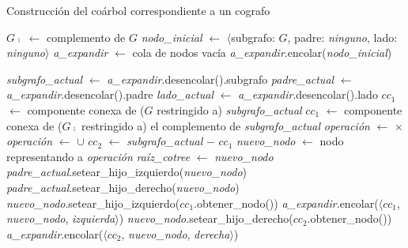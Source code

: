 \bigskip
\begin{algorithm}[H]
    \SetAlgoVlined
    \caption{Construcción del coárbol correspondiente a un cografo}

    $G\comp$ $\gets$ complemento de $G$ \;
    \textit{nodo\_inicial} $\gets$
    $\langle$subgrafo: $G$, padre: \textit{ninguno}, lado: \textit{ninguno}$\rangle$ \;
    \textit{a\_expandir} $\gets$ cola de nodos vacía \;
    \textit{a\_expandir}.encolar(\textit{nodo\_inicial}) \;

     {
        \textit{subgrafo\_actual} $\gets$ \textit{a\_expandir}.desencolar().subgrafo \;
        \textit{padre\_actual} $\gets$ \textit{a\_expandir}.desencolar().padre \;
        \textit{lado\_actual} $\gets$ \textit{a\_expandir}.desencolar().lado \;
        $cc_1$ $\gets$ componente conexa de ($G$ restringido a) \textit{subgrafo\_actual} \;
         {
            $cc_1$ $\gets$ componente conexa de ($G\comp$ restringido a) el complemento de \textit{subgrafo\_actual} \;
            \textit{operación} $\gets$ $\times$ \;
        } {
            \textit{operación} $\gets$ $\cup$ \;
        }
        $cc_2$ $\gets$ \textit{subgrafo\_actual} $-$ $cc_1$ \;
        \textit{nuevo\_nodo} $\gets$ nodo representando a \textit{operación} \;
         {
            \textit{raíz\_cotree} $\gets$ \textit{nuevo\_nodo} \;
        } {
             {
                \textit{padre\_actual}.setear\_hijo\_izquierdo(\textit{nuevo\_nodo}) \;
            } {
                \textit{padre\_actual}.setear\_hijo\_derecho(\textit{nuevo\_nodo}) \;
            }
        }
         {
            \textit{nuevo\_nodo}.setear\_hijo\_izquierdo($cc_1$.obtener\_nodo()) \;
        } {
            \textit{a\_expandir}.encolar($\langle cc_1$, \textit{nuevo\_nodo}, \textit{izquierda}$\rangle$) \;
        }
         {
            \textit{nuevo\_nodo}.setear\_hijo\_derecho($cc_2$.obtener\_nodo()) \;
        } {
            \textit{a\_expandir}.encolar($\langle cc_2$, \textit{nuevo\_nodo}, \textit{derecha}$\rangle$) \;
        }
    }
\end{algorithm}
\bigskip

